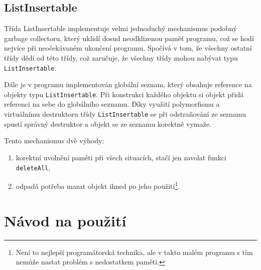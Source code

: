 \documentclass[a4paper, 11pt, hidelinks]{article}
\begin{document}
\subsection{ListInsertable}\label{3_5_ListInsertable}
Třída ListInsertable implementuje velmi jednoduchý mechanismus podobný garbage collectoru, který uklidí dosud neodklizenou paměť programu, což se hodí nejvíce při neočekávaném ukončení programu.
Spočívá v tom, že všechny ostatní třídy dědí od této třídy, což zaručuje, že všechny třídy mohou nabývat typu \texttt{ListInsertable}.

Dále je v programu implementován globální seznam, který obsahuje reference na objekty typu \texttt{ListInsertable}.
Při konstrukci každého objektu si objekt přidá referenci na sebe do globálního seznamu.
Díky využití polymorfismu a virtuálnímu destruktoru třídy \texttt{ListInsertable} se při odstraňování ze seznamu spustí správný destruktor a objekt se ze seznamu korektně vymaže. 

Tento mechanismus dvě výhody:
\begin{enumerate}
    \item korektní uvolnění paměti při všech situacích, stačí jen zavolat funkci \texttt{deleteAll},
    \item odpadá potřeba mazat objekt ihned po jeho použití\footnote[7]{Není to nejlepší programátorská technika, ale v takto malém programu s tím nemůže nastat problém s nedostatkem paměti.}.
\end{enumerate}

\section{Návod na použití}\label{5_navod}

\newpage


\end{document}

